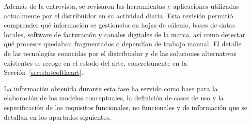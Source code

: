 Además de la entrevista, se revisaron las herramientas y aplicaciones utilizadas actualmente por el distribuidor en su actividad diaria. Esta revisión permitió comprender qué información se gestionaba en hojas de cálculo, bases de datos locales, software de facturación y canales digitales de la marca, así como detectar qué procesos quedaban fragmentados o dependían de trabajo manual. El detalle de las tecnologías conocidas por el distribuidor y de las soluciones alternativas existentes se recoge en el estado del arte, concretamente en la Sección~\ref{sec:stateoftheart}.

La información obtenida durante esta fase ha servido como base para la elaboración de los modelos conceptuales, la definición de casos de uso y la especificación de los requisitos funcionales, no funcionales y de información que se detallan en los apartados siguientes.
